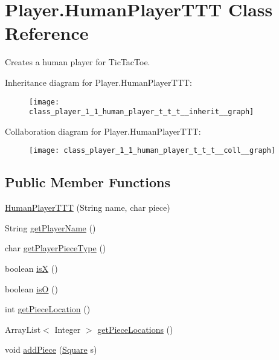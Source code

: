 \hypertarget{class_player_1_1_human_player_t_t_t}{}\section{Player.\+Human\+Player\+T\+T\+T Class Reference}
\label{class_player_1_1_human_player_t_t_t}


Creates a human player for Tic\+Tac\+Toe.  




Inheritance diagram for Player.\+Human\+Player\+T\+T\+T\+:
\nopagebreak
\begin{figure}[H]
\begin{center}
\leavevmode
\texttt{[image: class\_player\_1\_1\_human\_player\_t\_t\_t\_\_inherit\_\_graph]}
\end{center}
\end{figure}


Collaboration diagram for Player.\+Human\+Player\+T\+T\+T\+:
\nopagebreak
\begin{figure}[H]
\begin{center}
\leavevmode
\texttt{[image: class\_player\_1\_1\_human\_player\_t\_t\_t\_\_coll\_\_graph]}
\end{center}
\end{figure}
\subsection*{Public Member Functions}
\begin{DoxyCompactItemize}
\item 
\hyperlink{class_player_1_1_human_player_t_t_t_a617376ebf70bbb54f6ac722b1e9282a7}{Human\+Player\+T\+T\+T} (String name, char piece)
\item 
String \hyperlink{class_player_1_1_human_player_t_t_t_aadf14d433f944233d05f88cafb5e6a94}{get\+Player\+Name} ()
\item 
char \hyperlink{class_player_1_1_human_player_t_t_t_a3b80370f155683b77911850cc016e6a7}{get\+Player\+Piece\+Type} ()
\item 
boolean \hyperlink{class_player_1_1_human_player_t_t_t_a9c97f1c97829c9af212b8088e80ec7db}{is\+X} ()
\item 
boolean \hyperlink{class_player_1_1_human_player_t_t_t_acce1adf858320b165c07b8250b865edb}{is\+O} ()
\item 
int \hyperlink{class_player_1_1_human_player_t_t_t_a50f86fdac0e60ab7302f99f1ad25953b}{get\+Piece\+Location} ()
\item 
Array\+List$<$ Integer $>$ \hyperlink{class_player_1_1_human_player_t_t_t_accd55d5ba0f1bfc95ff64c3b15c57840}{get\+Piece\+Locations} ()
\item 
void \hyperlink{class_player_1_1_human_player_t_t_t_ab65859ad968e025536e8434efad24a6a}{add\+Piece} (\hyperlink{class_square_1_1_square}{Square} s)
\end{DoxyCompactItemize}
